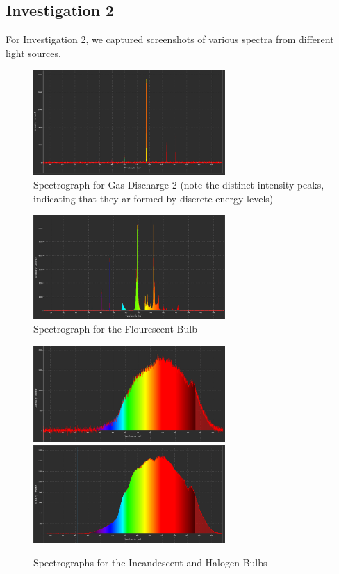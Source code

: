 \documentclass{article}[12pt]
\begin{document}
\subsection{Investigation 2}

For Investigation 2, we captured screenshots of various spectra from different light sources.

\begin{figure} [H]
  \centering
  \includegraphics[width=0.65\textwidth]{figures/gas2.png}
  \caption{Spectrograph for Gas Discharge 2 (note the distinct intensity peaks, indicating that they ar formed by discrete energy levels)}
  \label{gas2}
\end{figure}

\begin{figure} [H]
  \centering
  \includegraphics[width=0.65\textwidth]{figures/flourescent.png}
  \caption{Spectrograph for the Flourescent Bulb}
  \label{flour}
\end{figure}

\begin{figure} [H]
  \centering
  \includegraphics[width=0.65\textwidth]{figures/incandescent.png}
  \includegraphics[width=0.65\textwidth]{figures/halogen.png}
  \caption{Spectrographs for the Incandescent and Halogen Bulbs}
  \label{bbrad}
\end{figure}
\end{document}
